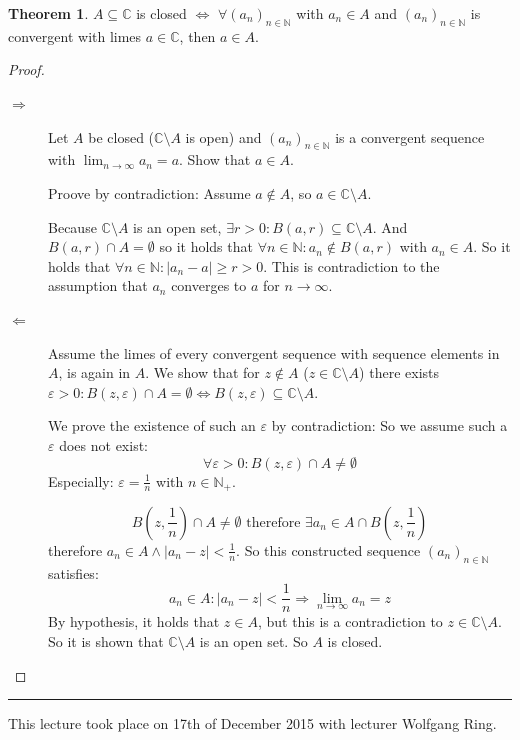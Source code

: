 \documentclass[a4paper,landscape,twocolumn]{article}
\theoremstyle{definition}
\newtheorem{theorem}{Theorem}
\newcommand\abs[1]{\left|#1\right|}
\newcommand\seq[1]{{\left(#1\right)}_{n \in \mathbb N}}
\newcommand\meta[3]{\hrule{} This #1 took place on #2 with lecturer #3.\par}
\begin{document}
\begin{theorem}
  $A \subseteq \mathbb C$ is closed $\Leftrightarrow$ $\forall \seq{a_n}$ with $a_n \in A$ and $\seq{a_n}$
  is convergent with limes $a \in \mathbb C$, then $a \in A$.
\end{theorem}
\begin{proof}
  \begin{description}
    \item[$\Rightarrow$]
      Let $A$ be closed ($\mathbb C \setminus A$ is open) and $\seq{a_n}$ is a convergent sequence with $\lim_{n\to\infty} a_n = a$.
      Show that $a \in A$.

      Proove by contradiction: Assume $a \not\in A$, so $a \in \mathbb C \setminus A$.

      Because $\mathbb C \setminus A$ is an open set, $\exists r > 0: B(a, r) \subseteq \mathbb C \setminus A$.
      And $B(a, r) \cap A = \emptyset$ so it holds that $\forall n \in \mathbb N: a_n \not\in B(a, r)$ with $a_n \in A$.
      So it holds that $\forall n \in \mathbb N: \abs{a_n - a} \geq r > 0$. This is contradiction to the assumption
      that $a_n$ converges to $a$ for $n \to \infty$.
    \item[$\Leftarrow$]
      Assume the limes of every convergent sequence with sequence elements in $A$,
      is again in $A$. We show that for $z \not\in A$ ($z \in \mathbb C \setminus A$)
      there exists $\varepsilon > 0: B(z, \varepsilon) \cap A = \emptyset \Leftrightarrow B(z, \varepsilon) \subseteq \mathbb C \setminus A$.

      We prove the existence of such an $\varepsilon$ by contradiction:
      So we assume such a $\varepsilon$ does not exist:
      \[ \forall \varepsilon > 0: B(z, \varepsilon) \cap A \neq \emptyset \]
      Especially: $\varepsilon = \frac1{n}$ with $n \in \mathbb N_+$.

      \[ B(z, \frac1n) \cap A \neq \emptyset \text{ therefore } \exists a_n \in A \cap B(z, \frac1n) \]
      therefore $a_n \in A \land \abs{a_n - z} < \frac1n$.
      So this constructed sequence $\seq{a_n}$ satisfies:
      \[ a_n \in A: \abs{a_n - z} < \frac1n \Rightarrow \lim_{n\to\infty} a_n = z \]
      By hypothesis, it holds that $z \in A$, but this is a contradiction to $z \in \mathbb C \setminus A$.
      So it is shown that $\mathbb C \setminus A$ is an open set. So $A$ is closed.
  \end{description}
\end{proof}

\meta{lecture}{17th of December 2015}{Wolfgang Ring}
\end{document}
